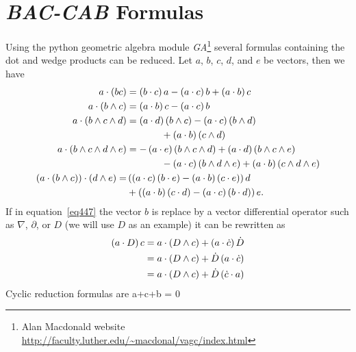 \chapter{{\em BAC-CAB} Formulas}\label{app_A}
Using the python geometric algebra module {\em  GA}\footnote{Alan Macdonald website \url{http://faculty.luther.edu/~macdonal/vagc/index.html}} 
several formulas containing the dot and wedge products can be reduced. Let $a$, $b$, $c$, $d$, and $e$ be vectors, then
we have
\begin{align}
a\cdot\left ( {bc} \right ) &= \left ( {b\cdot c} \right ) a-\left ( {a\cdot c} \right ) b+\left ( {a\cdot b} \right ) c \label{eq447a} \\
a\cdot\left ( {b\wedge c} \right ) &= \left ( {a\cdot b} \right ) c-\left ( {a\cdot c} \right ) b \label{eq447} \\
a\cdot\left ( {b\wedge c\wedge d} \right ) &= \left ( {a\cdot d} \right )\left ( {b\wedge c} \right )-\left ( {a\cdot c} \right )\left ( {b\wedge d} \right )\nonumber \\
                        &\hspace{0.5in}+\left ( {a\cdot b} \right )\left ( {c\wedge d} \right ) \label{eq448}\\
a\cdot\left ( {b\wedge c\wedge d\wedge e} \right ) &= -\left ( {a\cdot e} \right )\left ( {b\wedge c\wedge d} \right )+\left ( {a\cdot d} \right )\left ( {b\wedge c\wedge e} \right )\nonumber \\
                            &\hspace{0.5in}-\left ( {a\cdot c} \right )\left ( {b\wedge d\wedge e} \right )+\left ( {a\cdot b} \right )\left ( {c\wedge d\wedge e} \right ) \label{eq449}  \\                     
	\left ( {a\cdot\left ( {b\wedge c} \right )} \right )\cdot\left ( {d\wedge e} \right ) =& \left ( {\left ( {a\cdot c} \right )\left ( {b\cdot e} \right )
	                                                -\left ( {a\cdot b} \right )\left ( {c\cdot e} \right )} \right ) d \nonumber \\
	                                               & +\left ( {\left ( {a\cdot b} \right )\left ( {c\cdot d} \right )
	                                                -\left ( {a\cdot c} \right )\left ( {b\cdot d} \right )} \right ) e.\label{B5}
\end{align}
If in equation~\ref{eq447} the vector $b$ is replace by a vector differential operator such as $\nabla$, $\partial$, or $D$ (we will use $D$ as an example)
it can be rewritten as
\begin{align}
 \left ( {a\cdot D} \right ) c &= a\cdot\left ( {D\wedge c} \right )+\left ( {a\cdot \dot{c}} \right )\dot{D} \nonumber \\
                   &= a\cdot\left ( {D\wedge c} \right )+\dot{D}\left ( {a\cdot\dot{c}} \right ) \nonumber \\
                   &= a\cdot\left ( {D\wedge c} \right )+\dot{D}\left ( {\dot{c}\cdot a} \right )\label{eq450}
\end{align}
Cyclic reduction formulas are
\be 
a\cdot{}+c\cdot{}+b\cdot{} = 0
